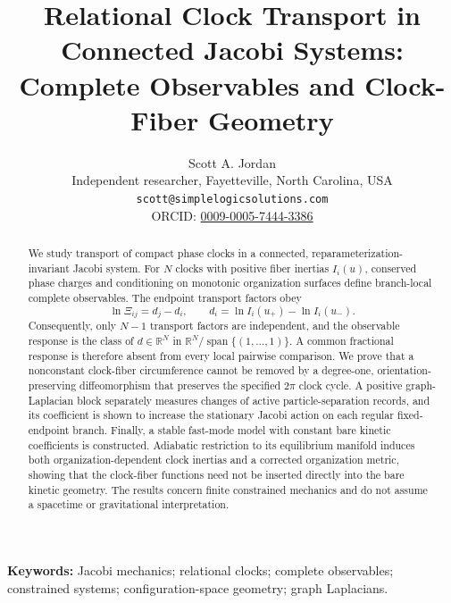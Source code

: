 \documentclass[11pt]{article}
\theoremstyle{plain}
\begin{document}
\title{Relational Clock Transport in Connected Jacobi Systems:\\
Complete Observables and Clock-Fiber Geometry}

\author{Scott A. Jordan\\
\small Independent researcher, Fayetteville, North Carolina, USA\\
\small \texttt{scott@simplelogicsolutions.com}\\
\small ORCID: \href{https://orcid.org/0009-0005-7444-3386}%
{0009-0005-7444-3386}}
\date{}

\maketitle

\begin{abstract}
We study transport of compact phase clocks in a connected,
reparameterization-invariant Jacobi system.  For $N$ clocks with positive
fiber inertias $I_i(u)$, conserved phase charges and conditioning on monotonic
organization surfaces define branch-local complete observables.  The endpoint
transport factors obey
\[
 \ln\Xi_{ij}=d_j-d_i,
 \qquad
 d_i=\ln I_i(u_+)-\ln I_i(u_-).
\]
Consequently, only $N-1$ transport factors are independent, and the observable
response is the class of $d\in\mathbb R^N$ in
$\mathbb R^N/\operatorname{span}\{(1,\ldots,1)\}$.  A common fractional
response is therefore absent from every local pairwise comparison.  We prove
that a nonconstant clock-fiber circumference cannot be removed by a
degree-one, orientation-preserving diffeomorphism that preserves the specified
$2\pi$ clock cycle.  A positive graph-Laplacian block separately measures
changes of active particle-separation records, and its coefficient is shown to
increase the stationary Jacobi action on each regular fixed-endpoint branch.
Finally, a stable fast-mode model with constant bare kinetic coefficients is
constructed.  Adiabatic restriction to its equilibrium manifold induces both
organization-dependent clock inertias and a corrected organization metric,
showing that the clock-fiber functions need not be inserted directly into the
bare kinetic geometry.  The results concern finite constrained mechanics and
do not assume a spacetime or gravitational interpretation.
\end{abstract}

\noindent\textbf{Keywords:} Jacobi mechanics; relational clocks; complete
observables; constrained systems; configuration-space geometry; graph
Laplacians.
\end{document}
